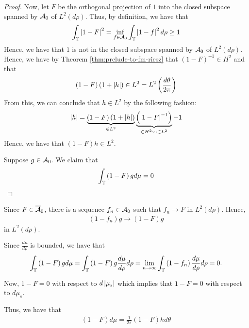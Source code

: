 \begin{proof}
Now, let $F$ be the orthogonal projection of $1$ into the closed subspace spanned by ${\cal A}_{0}$ of $L^{2} \left( d\rho \right)$. Thus, by definition, we have that 
\begin{equation*}
    \int_{\mathbb T} \left\lvert 1-F \right\rvert^{2} = \inf_{f\in {\cal A}_0} \int_{\mathbb T} \left\lvert 1-f \right\rvert^{2} d\rho \ge 1
\end{equation*}
Hence, we have that $1$ is not in the closed subspace spanned by ${\cal A}_{0}$ of $L^{2} (d\rho)$. Hence, we have by Theorem \ref{thm:prelude-to-fm-riesz} that $\left( 1-F \right)^{-1} \in H^{2}$ and that 
\begin{equation*}
    \left( 1-F \right) \left( 1+\left\lvert h \right\rvert \right) \in L^{2} = L^{2} \left( \frac{d\theta}{2\pi} \right)
\end{equation*}
From this, we can conclude that $h \in L^{2}$ by the following fashion:
\begin{equation*}
    \left\lvert h \right\rvert = \underbrace{\left( 1-F \right) \left( 1+ \left\lvert h \right\rvert \right)}_{\in L^{2}} \underbrace{\left( \left\lvert 1-F \right\rvert^{-1} \right)}_{\in H^{2} \leadsto \in L^{2}} -1
\end{equation*}
Hence, we have that $(1-F)h \in L^{2}$.

Suppose $g\in {\cal A}_{0}$. We claim that
\begin{align*}
    \int_{\mathbb T} \left( 1-F \right) g d\mu = 0
\end{align*}
\end{proof}

Since $F\in \overline {{\cal A}}_{0}$, there is a sequence $f_{n} \in {\cal A}_{0}$ such that $f_{n} \to F$ in $L^{2} (d\rho)$. Hence,
\begin{align*}
    (1-f_{n})g \to \left( 1-F \right)g
\end{align*}
in $L^{2} \left( d\rho \right)$.

Since $\frac{d\mu}{d\rho}$ is bounded, we have that 
\begin{equation*}
    \int_{\mathbb T} \left( 1-F \right) g d\mu = \int_{\mathbb T} \left( 1-F \right) g \frac{d\mu}{d\rho} d\rho = \lim_{n\to \infty} \int_{\mathbb T} \left( 1-f_{n} \right) \frac{d\mu}{d\rho} d\rho = 0 \text{.}
\end{equation*}

Now, $1-F = 0$ with respect to $d\left\lvert \mu_{s} \right\rvert$ which implies that $1-F= 0$ with respect to $d\mu_{s}$.

Thus, we have that 
\begin{align*}
    \left( 1-F \right) d \mu = \frac{1}{2\pi} \left( 1-F \right)h d\theta
\end{align*}

